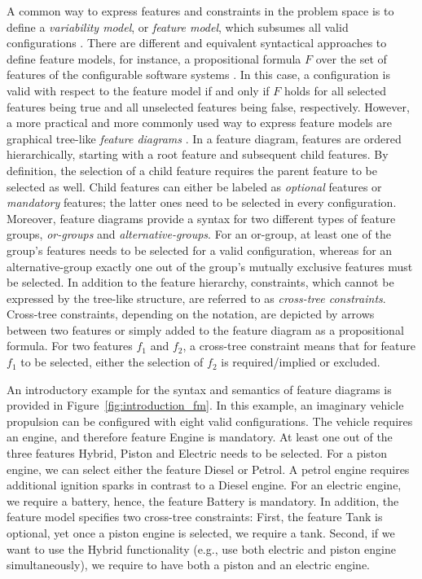 A common way to express features and constraints in the problem space is to
define a \emph{variability model}, or \emph{feature model}, which subsumes all
valid configurations
\citep{kang_feature-oriented_1990,thum_reasoning_2009,apel_feature-oriented_2013}.
There are different and equivalent syntactical approaches to define feature
models, for instance, a propositional formula $F$ over the set of features of
the configurable software systems \citep{batory_feature_2005}. In this case, a
configuration is valid with respect to the feature model if and only if $F$
holds for all selected features being true and all unselected features being
false, respectively.
However, a more practical and more commonly used way to express feature models
are graphical tree-like \emph{feature diagrams}
\citep{apel_feature-oriented_2013}. In a feature diagram, features are ordered
hierarchically, starting with a root feature and subsequent child features. By
definition, the selection of a child feature requires the parent feature to be
selected as well. Child features can either be labeled as \emph{optional}
features  or \emph{mandatory} features; the latter ones need to be selected in
every configuration.
Moreover, feature diagrams
provide a syntax for two different types of feature groups, \emph{or-groups} and
\emph{alternative-groups}. For an or-group, at least one of the group's features
needs to be selected for a valid configuration, whereas for an alternative-group
exactly one out of the group's mutually exclusive features must be selected. In
addition to the feature hierarchy, constraints, which cannot be expressed by
the tree-like structure, are referred to as \emph{cross-tree constraints}.
Cross-tree constraints, depending on the notation, are depicted by arrows
between two features or simply added to the feature diagram as a propositional
formula. For two features $f_1$ and $f_2$, a cross-tree constraint means
that for feature $f_1$ to be selected, either the selection of $f_2$ is
required/implied or excluded.

An introductory example for the syntax and semantics of feature diagrams is
provided in Figure~\ref{fig:introduction_fm}. In this example, an imaginary
vehicle propulsion can be configured with eight valid configurations. The
vehicle requires an engine, and therefore feature \textsf{Engine} is mandatory.
At least one out of the three features \textsf{Hybrid}, \textsf{Piston} and 
\textsf{Electric} needs to be selected. For a piston engine, we can select 
either the feature \textsf{Diesel} or \textsf{Petrol}. A petrol engine requires
additional ignition sparks in contrast to a Diesel engine. For an electric
engine, we require a battery, hence, the feature \textsf{Battery} is mandatory.
In addition, the feature model specifies two cross-tree constraints: First, the
feature \textsf{Tank} is optional, yet once a piston engine is selected, we
require  a tank. Second, if we want to use the \textsf{Hybrid} functionality
(e.g., use both electric and piston engine simultaneously), we require to have both a piston
and an electric engine.

